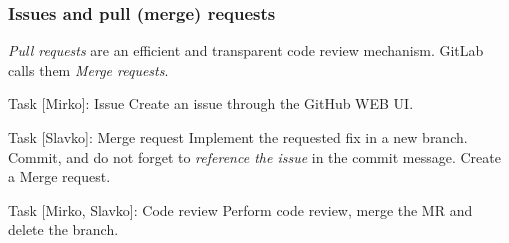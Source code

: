 
\begin{frame}[fragile]
	
\frametitle{Issues and pull (merge) requests}

\emph{Pull requests} are an efficient and transparent code review mechanism. GitLab calls them \emph{Merge requests}.

\begin{block}{Task [Mirko]: Issue}
Create an issue through the GitHub WEB UI.
\end{block}	

\begin{block}{Task [Slavko]: Merge request}
Implement the requested fix in a new branch. Commit, and do not forget to \emph{reference the issue} in the commit message. Create a Merge request.
\end{block}	

\begin{block}{Task [Mirko, Slavko]: Code review}
Perform code review, merge the MR and delete the branch.
\end{block}	


\end{frame}


%	
%	
%
%	
%	

